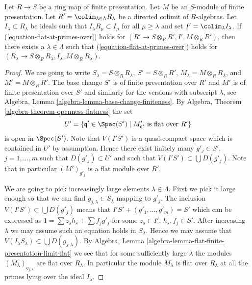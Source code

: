 \begin{lemma}
\label{lemma-limit-preserving-flat-at-primes-over}
Let $R \to S$ be a ring map of finite presentation.
Let $M$ be an $S$-module of finite presentation.
Let $R' = \colim_{\lambda \in \Lambda} R_\lambda$
be a directed colimit of $R$-algebras. Let $I_\lambda \subset R_\lambda$
be ideals such that $I_\lambda R_\mu \subset I_\mu$ for all $\mu \geq \lambda$
and set $I' = \colim_\lambda I_\lambda$.
If (\ref{equation-flat-at-primes-over}) holds for
$(R' \to S \otimes_R R', I', M \otimes_R R')$, then there exists
a $\lambda \in \Lambda$ such that
(\ref{equation-flat-at-primes-over}) holds for
$(R_\lambda \to S \otimes_R R_\lambda, I_\lambda, M \otimes_R R_\lambda)$.
\end{lemma}

\begin{proof}
We are going to write $S_\lambda = S \otimes_R R_\lambda$,
$S' = S \otimes_R R'$, $M_\lambda = M \otimes_R R_\lambda$, and
$M' = M \otimes_R R'$.
The base change $S'$ is of finite presentation over $R'$ and
$M'$ is of finite presentation over $S'$ and similarly for the
versions with subscript $\lambda$, see
Algebra, Lemma \ref{algebra-lemma-base-change-finiteness}.
By
Algebra, Theorem \ref{algebra-theorem-openness-flatness}
the set
$$
U' = \{\mathfrak q' \in \Spec(S') \mid
M'_{\mathfrak q'}\text{ is flat over }R'\}
$$
is open in $\Spec(S')$. Note that $V(I'S')$ is a quasi-compact space
which is contained in $U'$ by assumption. Hence there exist finitely many
$g'_j \in S'$, $j = 1, \ldots, m$ such that $D(g'_j) \subset U'$ and such
that $V(I'S') \subset \bigcup D(g'_j)$.
Note that in particular $(M')_{g'_j}$ is a flat module over $R'$.

\medskip\noindent
We are going to pick increasingly large elements $\lambda \in \Lambda$.
First we pick it large enough so that we can find
$g_{j, \lambda} \in S_{\lambda}$ mapping to $g'_j$.
The inclusion $V(I'S') \subset \bigcup D(g'_j)$ means that
$I'S' + (g'_1, \ldots, g'_m) = S'$ which can be expressed as
$1 = \sum z_sh_s + \sum f_jg'_j$ for some $z_s \in I'$, $h_s, f_j \in S'$.
After increasing $\lambda$ we may assume such an equation holds in
$S_\lambda$. Hence we may assume that
$V(I_\lambda S_\lambda) \subset \bigcup D(g_{j, \lambda})$. By
Algebra, Lemma \ref{algebra-lemma-flat-finite-presentation-limit-flat}
we see that for some sufficiently large $\lambda$ the modules
$(M_\lambda)_{g_{j, \lambda}}$ are flat over $R_\lambda$.
In particular the module $M_\lambda$ is flat over $R_\lambda$
at all the primes lying over the ideal $I_\lambda$.
\end{proof}









